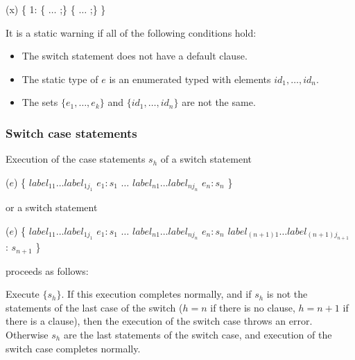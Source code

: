 \documentclass{article}
\begin{document}
\begin{dartCode}
\SWITCH{} (x) \{
  \CASE{} 1: \TRY{} \{ $\ldots$ \RETURN{};\} \FINALLY{} \{ $\ldots$ \RETURN{};\}
\}
\end{dartCode}


\LMHash{}
It is a static warning if all of the following conditions hold:
\begin{itemize}
\item The switch statement does not have a default clause.
\item The static type of $e$ is an enumerated typed with elements $id_1, \ldots, id_n$.
\item The sets $\{e_1, \ldots, e_k\} $ and $\{id_1, \ldots, id_n\}$ are not the same.
\end{itemize}



\subsubsection{Switch case statements}

\LMHash{}
Execution of the case statements $s_h$ of a switch statement

\begin{dartCode}
\SWITCH{} ($e$) \{
   $label_{11} \ldots label_{1j_1}$ \CASE{} $e_1: s_1$
   $\ldots$
   $label_{n1} \ldots label_{nj_n}$ \CASE{} $e_n: s_n$
\}
\end{dartCode}

or a switch statement

\begin{dartCode}
\SWITCH{} ($e$) \{
   $label_{11} \ldots label_{1j_1}$ \CASE{} $e_1: s_1$
   $\ldots$
   $label_{n1} \ldots label_{nj_n}$ \CASE{} $e_n: s_n$
   $label_{(n+1)1} \ldots label_{(n+1)j_{n+1}}$ \DEFAULT{}: $s_{n+1}$
\}
\end{dartCode}

proceeds as follows:

\LMHash{}
Execute $\{s_h\}$.
If this execution completes normally,
and if $s_h$ is not the statements of the last case of the switch
($h = n$ if there is no \DEFAULT{} clause,
$h = n+1$ if there is a \DEFAULT{} clause),
then the execution of the switch case throws an error.
Otherwise $s_h$ are the last statements of the switch case,
and execution of the switch case completes normally.
\end{document}
